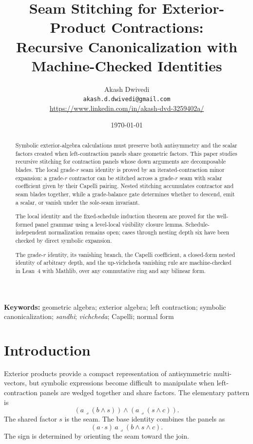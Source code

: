 \documentclass[11pt]{article}
\title{Seam Stitching for Exterior-Product Contractions:\\
Recursive Canonicalization with Machine-Checked Identities}
\author{Akash Dwivedi\\
\texttt{akash.d.dwivedi@gmail.com}\\
\url{https://www.linkedin.com/in/akash-dvd-3259402a/}}
\date{\today}
\newcommand{\sandhi}{\textit{sandhi}}
\newcommand{\vichcheda}{\textit{vichcheda}}
\begin{document}
\maketitle

\begin{abstract}
Symbolic exterior-algebra calculations must preserve both antisymmetry and the
scalar factors created when left-contraction panels share geometric factors.
This paper studies recursive stitching for contraction panels whose down
arguments are decomposable blades. The local grade-\(r\) seam identity is
proved by an iterated-contraction minor expansion: a grade-\(r\) contractor
can be stitched across a grade-\(r\) seam with scalar coefficient given by
their Capelli pairing. Nested stitching accumulates contractor and seam blades
together, while a grade-balance gate determines whether to descend, emit a
scalar, or vanish under the sole-seam invariant.

The local identity and the fixed-schedule induction theorem are proved for the
well-formed panel grammar using a level-local visibility closure lemma.
Schedule-independent normalization remains open; cases through nesting depth
six have been checked by direct symbolic expansion.

The grade-\(r\) identity, its vanishing branch, the Capelli coefficient, a
closed-form nested identity of arbitrary depth, and the up-vichcheda vanishing
rule are machine-checked in Lean~4 with Mathlib, over any commutative ring and
any bilinear form.
\end{abstract}

\noindent\textbf{Keywords:}
geometric algebra; exterior algebra; left contraction; symbolic
canonicalization; \sandhi; \vichcheda; Capelli; normal form

\section*{Introduction}

Exterior products provide a compact representation of antisymmetric
multi-vectors, but symbolic expressions become difficult to manipulate when
left-contraction panels are wedged together and share factors. The elementary
pattern is
\[
(a\mathbin{\lrcorner}(b\wedge s))\wedge
 (a\mathbin{\lrcorner}(s\wedge c)).
\]
The shared factor \(s\) is the seam. The base identity combines the panels as
\[
(a\cdot s)\,
 a\mathbin{\lrcorner}(b\wedge s\wedge c).
\]
The sign is determined by orienting the seam toward the join.
\end{document}
